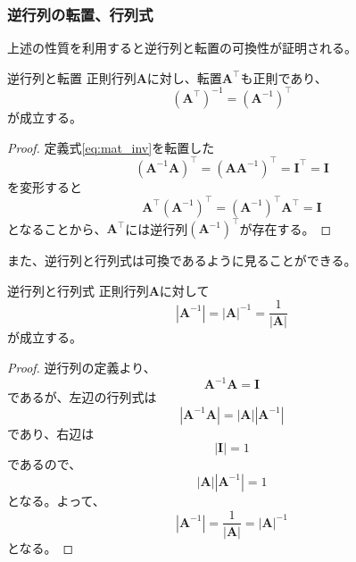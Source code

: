 \subsubsection{逆行列の転置、行列式}
上述の性質を利用すると逆行列と転置の可換性が証明される。
\begin{theorem*}{逆行列と転置}
	正則行列\(\boldsymbol{A}\)に対し、転置\(\boldsymbol{A}^{\top}\)も正則であり、
	\begin{equation}
		(\boldsymbol{A}^{\top})^{-1}=(\boldsymbol{A}^{-1})^{\top}
	\end{equation}
	が成立する。
\end{theorem*}
\begin{proof}
	定義式\autoref{eq:mat_inv}を転置した
	\begin{equation}
		(\boldsymbol{A}^{-1}\boldsymbol{A})^{\top}=(\boldsymbol{A}\boldsymbol{A}^{-1})^{\top}=\boldsymbol{I}^{\top}=\boldsymbol{I}
	\end{equation}
	を変形すると
	\begin{equation}
		\boldsymbol{A}^{\top}(\boldsymbol{A}^{-1})^{\top}=(\boldsymbol{A}^{-1})^{\top}\boldsymbol{A}^{\top}=\boldsymbol{I}
	\end{equation}
	となることから、\(\boldsymbol{A}^{\top}\)には逆行列\((\boldsymbol{A}^{-1})^{\top}\)が存在する。
\end{proof}
また、逆行列と行列式は可換であるように見ることができる。
\begin{theorem*}{逆行列と行列式}
	正則行列\(\boldsymbol{A}\)に対して
	\begin{equation}
		|\boldsymbol{A}^{-1}|=|\boldsymbol{A}|^{-1}=\frac{1}{|\boldsymbol{A}|}
	\end{equation}
	が成立する。
\end{theorem*}
\begin{proof}
	逆行列の定義より、
	\begin{equation}
		\boldsymbol{A}^{-1}\boldsymbol{A}=\boldsymbol{I}
	\end{equation}
	であるが、左辺の行列式は
	\begin{equation}
		|\boldsymbol{A}^{-1}\boldsymbol{A}|=|\boldsymbol{A}||\boldsymbol{A}^{-1}|
	\end{equation}
	であり、右辺は
	\begin{equation}
		|\boldsymbol{I}|=1
	\end{equation}
	であるので、
	\begin{equation}
		|\boldsymbol{A}||\boldsymbol{A}^{-1}|=1
	\end{equation}
	となる。よって、
	\begin{equation}
		|\boldsymbol{A}^{-1}|=\frac{1}{|\boldsymbol{A}|}=|\boldsymbol{A}|^{-1}
	\end{equation}
	となる。
\end{proof}

